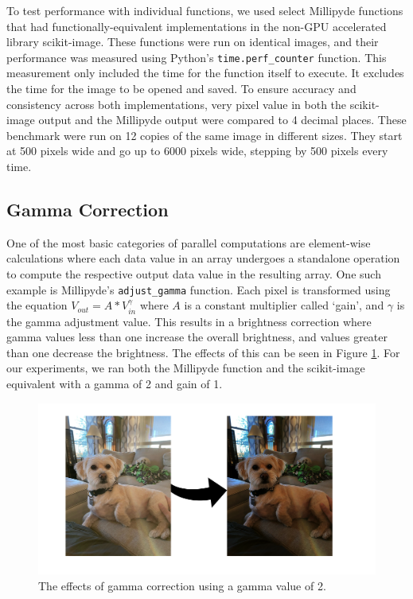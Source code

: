 To test performance with individual functions, we used select Millipyde functions that had functionally-equivalent implementations in the non-GPU accelerated library scikit-image. These functions were run on identical images, and their performance was measured using Python's \verb|time.perf_counter| function. This measurement only included the time for the function itself to execute. It excludes the time for the image to be opened and saved. To ensure accuracy and consistency across both implementations, very pixel value in both the scikit-image output and the Millipyde output were compared to 4 decimal places. These benchmark were run on 12 copies of the same image in different sizes. They start at 500 pixels wide and go up to 6000 pixels wide, stepping by 500 pixels every time. 

\subsection{Gamma Correction}

One of the most basic categories of parallel computations are element-wise calculations where each data value in an array undergoes a standalone operation to compute the respective output data value in the resulting array. One such example is Millipyde's \verb|adjust_gamma| function. Each pixel is transformed using the equation $V_{out} = A * V_{in} ^ \gamma$ where  $A$ is a constant multiplier called `gain', and $\gamma$ is the gamma adjustment value. This results in a brightness correction where gamma values less than one increase the overall brightness, and values greater than one decrease the brightness. The effects of this can be seen in Figure \ref{gammaExample}. For our experiments, we ran both the Millipyde function and the scikit-image equivalent with a gamma of 2 and gain of 1.

\begin{figure}[H]
\includegraphics[width=\textwidth]{figures/GammaExample.png}
\centering
\caption{The effects of gamma correction using a gamma value of 2.}
\label{gammaExample}
\end{figure}

